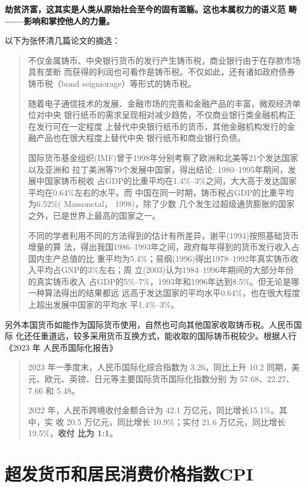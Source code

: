 \textbf{劫贫济富，这其实是人类从原始社会至今的固有滥觞。这也本属权力的语义范
  畴——影响和掌控他人的力量。}

以下为张怀清几篇论文的摘选：
\begin{quotation}
  不仅金属铸币、中央银行货币的发行产生铸币税，商业银行由于在存款市场具有垄断
  而获得的利润也可看作是铸币税。不仅如此，还有诸如政府债券铸币税（bond
  seigniorage）等形式的铸币税。

  随着电子通信技术的发展、金融市场的完善和金融产品的丰富，微观经济单位对中央
  银行纸币的需求呈现相对减少趋势，不仅商业银行类金融机构正在发行可在一定程度
  上替代中央银行纸币的货币，其他金融机构发行的金融产品也在很大程度上替代中央
  银行纸币和商业银行负债。

  国际货币基金组织(IMF)曾于1998年分别考察了欧洲和北美等21个发达国家以及亚洲和
  拉丁美洲等79个发展中国家，得出结论: 1980–1995年期间，发展中国家铸币税收
  占GDP的比重平均在1.4\%–3\%之间，大大高于发达国家平均在0.64\%左右的水平。而
  中国在同一时期，铸币税占GDP的比重平均为6.52\%( Massonetal， 1998)，除了少数
  几个发生过超级通货膨胀的国家之外，已是世界上最高的国家之一。

  不同的学者利用不同的方法得到的估计有所差异，谢平(1994)按照基础货币增量的算
  法，得出我国1986--1993年之间，政府每年得到的货币发行收入占国内生产总值的比
  重平均为5.4\%；易纲(1996)得出1978--1992年真实铸币收入平均占GNP的3\%左右；周
  立(2003)认为1984--1996年期间的大部分年份的真实铸币收入
  占GDP的5\%--7\%，1993年和1996年达到8.5\%。但无论是哪一种算法得出的结果都远
  远高于发达国家的平均水平0.64\%，也在很大程度上超出发展中国家的平均水
  平1.4\%--3\%。
\end{quotation}

另外本国货币如能作为国际货币使用，自然也可向其他国家收取铸币税。人民币国际
化还任重道远，较多采用货币互换方式，能收取的国际铸币税较少。根据人行《2023 年
人民币国际化报告》
\begin{quotation}
  2023 年一季度末，人民币国际化综合指数为 3.26，同比上升 10.2%
  同期，美元、欧元、英镑、日元等主要国际货币国际化指数分别
  为 57.68、22.27、7.66 和 5.48。

  2022 年，人民币跨境收付金额合计为 42.1 万亿元，同比增长15.1\%。其中，实
  收 20.5 万亿元，同比增长 10.9\%；实付 21.6 万亿元，同比增长 19.5\%，\textbf{收付
    比为 1:1}。
\end{quotation}


\section{超发货币和居民消费价格指数CPI}

